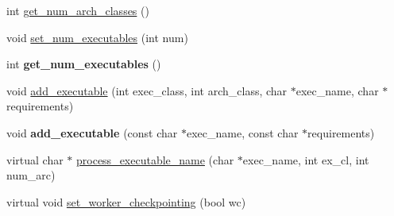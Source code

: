 \begin{DoxyCompactItemize}
\item 
int \hyperlink{classMWRMComm_a13a4ea4e7279c556ad1608c0b250a33f}{get\+\_\+num\+\_\+arch\+\_\+classes} ()
\item 
void \hyperlink{classMWRMComm_a874259ae975681f5bbac122c119c2067}{set\+\_\+num\+\_\+executables} (int num)
\item 
\mbox{\label{classMWRMComm_ad55f08e4878d4e2c241538bba4711b28}} 
int {\bfseries get\+\_\+num\+\_\+executables} ()
\item 
void \hyperlink{classMWRMComm_ad45f645fdb840975d25614217626532d}{add\+\_\+executable} (int exec\+\_\+class, int arch\+\_\+class, char $\ast$exec\+\_\+name, char $\ast$requirements)
\item 
\mbox{\label{classMWRMComm_aeb6d7df2a7d9c633539837aa5e1778d8}} 
void {\bfseries add\+\_\+executable} (const char $\ast$exec\+\_\+name, const char $\ast$requirements)
\item 
virtual char $\ast$ \hyperlink{classMWRMComm_a10818d71f30ad62b5d747e0b5ef07d68}{process\+\_\+executable\+\_\+name} (char $\ast$exec\+\_\+name, int ex\+\_\+cl, int num\+\_\+arc)
\item 
virtual void \hyperlink{classMWRMComm_abff2205c7cd05ba73701b5e813873e46}{set\+\_\+worker\+\_\+checkpointing} (bool wc)
\end{DoxyCompactItemize}
